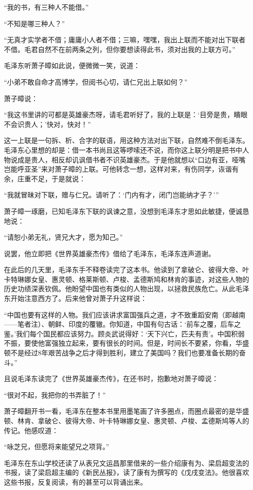 \documentclass[../../dazhuan.tex]{subfiles}
\begin{document}
“我的书，有三种人不能借。”

“不知是哪三种人？”

“无真才实学者不借；庸庸小人者不借；三嘛，嘿嘿，我出上联而不能对出下联者不借。毛君自然不在前两条之列，但你要想读得此书，须对出我的上联方可。”

毛泽东听萧子暲如此说，便微微一笑，说道：

“小弟不敢自命才高博学，但阅书心切，请仁兄出上联如何？”

萧子暲说：

“我这书里讲的可都是英雄豪杰呀，请毛君听好了，我的上联是：‘目旁是贵，瞶眼不会识贵人；’快对，快对！”

这一上联是一句拆、析、合字的联语，用这种方法对出下联，自然难不倒毛泽东。毛泽东心里想的却是：借一本书尚且这等啰嗦还不说，而你这上联分明是把书中人物说成是贵人，相反却讥讽借书者不识英雄豪杰。于是他就想以“口边有亚，哑嘴岂能呼亚圣”来对萧子暲的上联。可他转念一想，这样对来，有伤同学，诙谐有余，庄重不足，于是就说：

“我就冒昧对下联，赠与仁兄。请听了：‘门内有才，闭门岂能纳才子？’”

萧子暲一琢磨，已知毛泽东下联的讽谏之意，没想到毛泽东才思如此敏捷，便诚恳地说：

“请恕小弟无礼，贤兄大才，愿为知己。”

说罢，他立即把《世界英雄豪杰传》借给了毛泽东，毛泽东连声道谢。

在此后的几天里，毛泽东手不释卷读完了这本书。他读到了拿破仑、彼得大帝、叶卡特琳娜女皇、惠灵顿、格莱斯顿、卢梭、孟德斯鸠和林肯的事迹，对这些人物的历史功绩深表钦佩。他盼望中国也有类似的人物出现，以拯救民族危亡。从此毛泽东开始注意西方了。后来他曾对萧子升这样说：

“中国也要有这样的人物。我们应该讲求富国强兵之道，才不致重蹈安南（即越南——笔者注）、朝鲜、印度的覆辙。你知道，中国有句古话：‘前车之覆，后车之鉴。’我们每个国民都应该努力。顾炎武说得好：‘天下兴亡，匹夫有责’。中国积弱不振，要使他富强独立起来，要有很长的时间。但是，时间长不要紧，你看，华盛顿不是经过8年艰苦战争之后才得到胜利，建立了美国吗？我们也要准备长期的奋斗。”

且说毛泽东读完了《世界英雄豪杰传》，在还书时，抱歉地对萧子暲说：

“很对不起，我把你的书弄脏了！”

萧子暲翻开书一看，毛泽东在整本书里用墨笔画了许多圈点，而圈点最密的是华盛顿、林肯、拿破仑、彼得大帝、叶卡特琳娜女皇、惠灵顿、卢梭、孟德斯鸠等人的传记。他感叹道：

“咏芝兄，但愿将来能望兄之项背。”

毛泽东在东山学校还读了从表兄文运昌那里借来的一些介绍康有为、梁启超变法的书报，读了梁启超主编的《新民丛报》，读了康有为撰写的《戊戌变法》。他很喜欢这些书报，反复阅读，有的甚至可以背诵出来。
\end{document}
